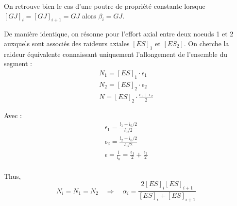 {On retrouve bien le cas d'une poutre de propriété constante lorsque $[GJ]_i= [GJ]_{i+1} = GJ$ alors $\beta_i = GJ$.


De manière identique, on résonne pour l'effort axial entre deux noeuds 1 et 2 auxquels sont associés des raideurs axiales $[ES]_1$ et $[ES_2]$. On cherche la raideur équivalente connaissant uniquement l'allongement de l'ensemble du segment :
\begin{subequations}
	\begin{gather}
	N_1 = [ES]_1 \cdot \epsilon_1 \\
	N_2 = [ES]_2 \cdot \epsilon_2 \\
	N =  [ES]_2 \cdot \frac{\epsilon_1 + \epsilon_2}{2}
	\end{gather}
\end{subequations}

Avec :
\begin{subequations}
	\begin{gather}
	\epsilon_1 = \frac{l_1 - l_0/2}{l_0/2} \\
	\epsilon_2 = \frac{l_2 - l_0/2}{l_0/2} \\
	\epsilon = \frac{l}{l_0} = \frac{\epsilon_1}{2} + \frac{\epsilon_2}{2}  \\
	\end{gather}
\end{subequations}

Thus,
 \begin{equation}
	N_i = N_1 = N_2 \quad \Rightarrow \quad  \alpha_i = \frac{2 [ES]_i [ES]_{i+1}}{[ES]_i + [ES]_{i+1}}
\end{equation}


 }




